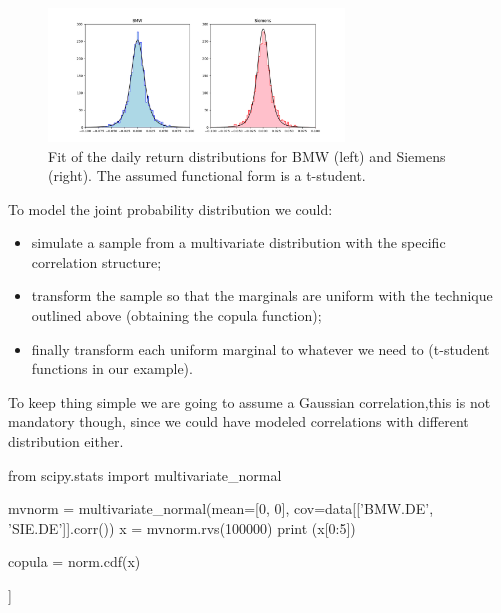 \begin{figure}[htbp]
\centering
\includegraphics[width=0.7\textwidth]{figures/bmw_siemens_fit}
\caption{Fit of the daily return distributions for BMW (left) and Siemens (right). The assumed functional form is a t-student.}
\label{fig:bmw_sie_fit}
\end{figure}


To model the joint probability distribution we could:
\begin{itemize}
\tightlist
\item simulate a sample from a multivariate distribution with the specific correlation structure;
\item transform the sample so that the marginals are uniform with the technique outlined above (obtaining the copula function);
\item finally transform each uniform marginal to whatever we need to (t-student functions in our example).
\end{itemize}

To keep thing simple we are going to assume a Gaussian correlation,this is not mandatory though, since we could have modeled correlations with different distribution either.


\begin{ipython}
from scipy.stats import multivariate_normal

mvnorm = multivariate_normal(mean=[0, 0], cov=data[['BMW.DE', 'SIE.DE']].corr())
x = mvnorm.rvs(100000)
print (x[0:5])

copula = norm.cdf(x)
\end{ipython}
\begin{ioutput}
[[-0.03120891 -0.24918657]
 [-0.17677523 -1.01992715]
 [-0.60572525  0.95517049]
 [-0.79814057  0.69339518]
 [ 0.11990304  0.0947739 ]]
\end{ioutput}

